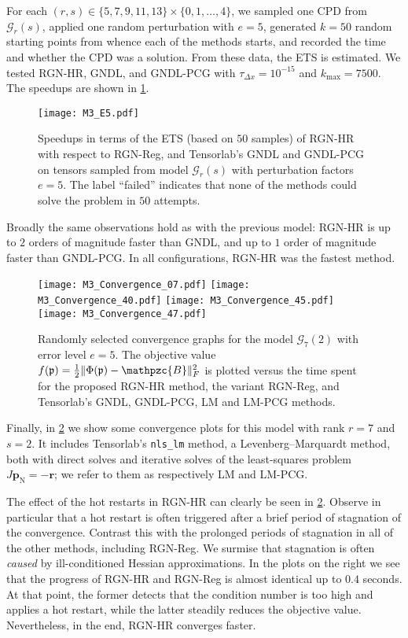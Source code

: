 \documentclass[a4paper,10pt,final]{siamart1116}
\newcommand{\tuple}[1]{\mathfrak{#1}}
\newcommand{\Var}[1]{\mathcal{#1}}
\newcommand{\tensor}[1]{\mathpzc{#1}}
\newcommand{\vect}[1]{\mathbf{#1}}
\newcommand{\reffig}[1]{{\cref{#1}}}
\numberwithin{equation}{section}
\numberwithin{figure}{section}
\numberwithin{table}{section}
\numberwithin{theorem}{section}
\begin{document}
For each $(r,s) \in \{ 5, 7, 9, 11, 13 \} \times \{0,1,\ldots,4\}$, we sampled one CPD from $\Var{G}_{r}(s)$, applied one random perturbation with $e=5$, generated $k = 50$ random starting points from whence each of the methods starts, and recorded the time and whether the CPD was a solution. From these data, the ETS is estimated. We tested RGN-HR, GNDL, and GNDL-PCG with $\tau_{\Delta x} = 10^{-15}$ and $k_{\max} = 7500$. The speedups are shown in \reffig{fig_model3}.

\begin{figure}[tb]\centering\small
\texttt{[image: M3\_E5.pdf]}
\caption{Speedups in terms of the ETS (based on $50$ samples) of RGN-HR with respect to RGN-Reg, and Tensorlab's GNDL and GNDL-PCG on tensors sampled from model $\Var{G}_{r}(s)$ with perturbation factors $e = 5$. The label ``failed'' indicates that none of the methods could solve the problem in $50$ attempts.}
\label{fig_model3}
\end{figure}

Broadly the same observations hold as with the previous model: RGN-HR is up to $2$ orders of magnitude faster than GNDL, and up to $1$ order of magnitude faster than GNDL-PCG. In all configurations, RGN-HR was the fastest method.

\begin{figure}\centering \small
\texttt{[image: M3\_Convergence\_07.pdf]}
\texttt{[image: M3\_Convergence\_40.pdf]} %
\texttt{[image: M3\_Convergence\_45.pdf]}
\texttt{[image: M3\_Convergence\_47.pdf]}
\caption{Randomly selected convergence graphs for the model $\Var{G}_{7}(2)$ with error level $e=5$. The objective value $f(\tuple{p}) = \frac{1}{2}\|\Phi(\tuple{p}) - \tensor{B}\|_F^2$ is plotted versus the time spent for the proposed RGN-HR method, the variant RGN-Reg, and Tensorlab's GNDL, GNDL-PCG, LM and LM-PCG methods.}
\label{fig_model3_convergence}
\end{figure}

Finally, in \reffig{fig_model3_convergence} we show some convergence plots for this model with rank $r=7$ and $s=2$. It includes Tensorlab's \texttt{nls\_lm} method, a Levenberg--Marquardt method, both with direct solves and iterative solves of the least-squares problem $J \vect{p}_{\text{N}} = -\vect{r}$; we refer to them as respectively LM and LM-PCG.


The effect of the hot restarts in RGN-HR can clearly be seen in \reffig{fig_model3_convergence}. Observe in particular that a hot restart is often triggered after a brief period of stagnation of the convergence. {Contrast this with the prolonged periods of stagnation in all of the other methods, including RGN-Reg.} We surmise that stagnation is often \emph{caused} by ill-conditioned Hessian approximations. In the plots on the right we see that the progress of RGN-HR and RGN-Reg is almost identical up to $0.4$ seconds. At that point, the former detects that the condition number is too high and applies a hot restart, while the latter steadily reduces the objective value. Nevertheless, in the end, RGN-HR converges faster.
\end{document}
